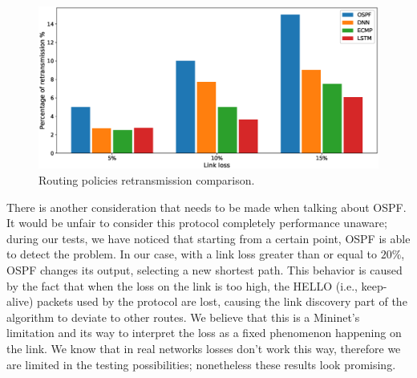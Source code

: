 \begin{figure}
\centering
\includegraphics[width=\textwidth]{img/prediction_full_cmp_bar}
\caption{Routing policies retransmission comparison.}
\label{fig:prediction_cmp}
\end{figure}
There is another consideration that needs to be made when talking about OSPF. It would be unfair to consider this protocol completely performance unaware; during our tests, we have noticed that starting from a certain point, OSPF is  able to detect the problem. In our case, with a link loss greater than or equal to $20\%$, OSPF changes its output, selecting a new shortest path. This behavior is caused by the fact that when the loss on the link is too high, the HELLO (i.e., keep-alive) packets used by the protocol are lost, causing the link discovery part of the algorithm to deviate to other routes. We believe that this is a Mininet's limitation and its way to interpret the loss as a fixed phenomenon happening on the link. We know that in real networks losses don't work this way, therefore we are limited in the testing possibilities; nonetheless these results look promising.

